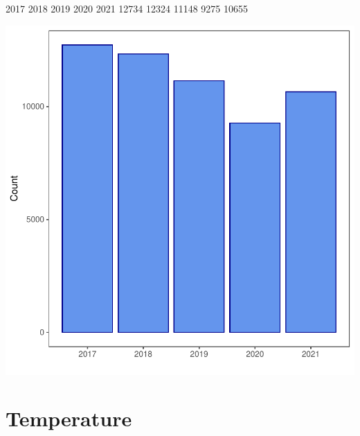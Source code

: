 \documentclass[11pt, a4paper]{article}
\begin{document}
\begin{Schunk}
\begin{Soutput}
 2017  2018  2019  2020  2021 
12734 12324 11148  9275 10655 
\end{Soutput}
\end{Schunk}
\includegraphics{variableinvestigation-005}





\pagebreak
\section{Temperature}
\end{document}
